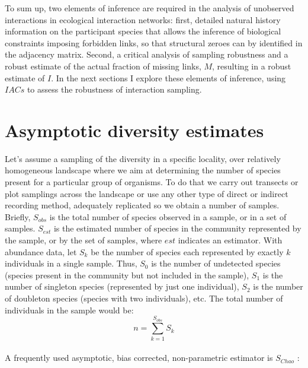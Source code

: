 \documentclass[12pt]{article}
\begin{document}

To sum up, two elements of inference are required in the analysis of unobserved interactions in ecological interaction networks: first, detailed natural history information on the participant species that allows the inference of biological constraints imposing forbidden links, so that structural zeroes can by identified in the adjacency matrix. Second, a critical analysis of sampling robustness and a robust estimate of the actual fraction of missing links, $M$, resulting in a robust estimate of $I$. In the next sections I explore these elements of inference, using $IACs$ to assess the robustness of interaction sampling.

\section*{Asymptotic diversity estimates}
\label{asymptoticdiversityestimates}

Let's assume a sampling of the diversity in a specific locality, over relatively homogeneous landscape where we aim at determining the number of species present for a particular group of organisms. To do that we carry out transects or plot samplings across the landscape or use any other type of direct or indirect recording method, adequately replicated so we obtain a number of samples. Briefly, $S_{obs}$ is the total number of species observed in a sample, or in a set of samples. $S_{est}$ is the estimated number of species in the community represented by the sample, or by the set of samples, where $est$ indicates an estimator. With abundance data, let $S_k$ be the number of species each represented by exactly $k$ individuals in a single sample. Thus, $S_0$ is the number of undetected species (species present in the community but not included in the sample), $S_1$ is the number of singleton species (represented by just one individual), $S_2$ is the number of doubleton species (species with two individuals), etc. The total number of individuals in the sample would be:\\
$$n = \sum_{k=1}^{S_{obs}}S_k$$\\
A frequently used asymptotic, bias corrected, non-parametric estimator is $S_{Chao}$ \citep{Hortal:2006dc,Chao:2005wp,Colwell:2013kj}: 
\end{document}
